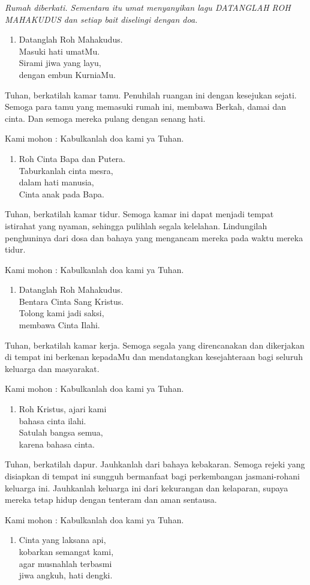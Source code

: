 \documentclass[12pt,twoside]{book}
\makeatletter
\renewenvironment{description}
               {\list{}{\labelwidth\z@ \itemindent-\leftmargin
                        \let\makelabel\descriptionlabel}}
               {\endlist}
\renewcommand*\descriptionlabel[1]{\hspace\labelsep 
                                \normalfont\bfseries #1 }
\newcommand{\doa}[2]{%
  \begin{description}
  \item[Doa untuk #1] #2
   
   Kami mohon : Kabulkanlah doa kami ya Tuhan.
  \end{description}
}
\newcommand{\bait}[1]{%
  \begin{enumerate}
  \slshape
  \setcounter{enumi}{\value{urut}}
  \item #1
  \setcounter{urut}{\value{enumi}}
  \end{enumerate}	
}
\makeatother
\begin{document}
{\itshape Rumah diberkati. Sementara itu umat menyanyikan lagu \emph{DATANGLAH ROH MAHAKUDUS} dan setiap bait diselingi dengan doa.}


\bait{Datanglah Roh Mahakudus. \\Masuki hati umatMu. \\Sirami jiwa yang layu, \\dengan embun KurniaMu.}

\doa{kamar tamu}{%
Tuhan, berkatilah kamar tamu. Penuhilah ruangan ini dengan kesejukan sejati. Semoga para tamu yang memasuki rumah ini, membawa Berkah, damai dan cinta. Dan semoga mereka pulang dengan senang hati.}

\bait{Roh Cinta Bapa dan Putera.\\ Taburkanlah cinta mesra,\\ dalam hati manusia,\\ Cinta anak pada Bapa.}

\doa{kamar tidur}{
Tuhan, berkatilah kamar tidur. Semoga kamar ini dapat menjadi tempat istirahat yang nyaman, sehingga pulihlah segala kelelahan. Lindungilah penghuninya dari dosa dan bahaya yang mengancam mereka pada waktu mereka tidur.}

\bait{Datanglah Roh Mahakudus.\\ Bentara Cinta Sang Kristus.\\ Tolong kami jadi saksi,\\ membawa Cinta Ilahi.}

\doa{kamar kerja}{
Tuhan, berkatilah kamar kerja. Semoga segala yang direncanakan dan dikerjakan di tempat ini berkenan kepadaMu dan mendatangkan kesejahteraan bagi seluruh keluarga dan masyarakat.}

\bait{Roh Kristus, ajari kami\\ bahasa cinta ilahi. \\Satulah bangsa semua,\\ karena bahasa cinta.}

\doa{dapur}{
Tuhan, berkatilah dapur. Jauhkanlah dari bahaya kebakaran. Semoga rejeki yang disiapkan di tempat ini sungguh bermanfaat bagi perkembangan jasmani-rohani keluarga ini. Jauhkanlah keluarga ini dari kekurangan dan kelaparan, supaya mereka tetap hidup dengan tenteram dan aman sentausa.}

\bait{Cinta yang laksana api,\\ kobarkan semangat kami,\\ agar musnahlah terbasmi\\ jiwa angkuh, hati dengki.}
\end{document}
